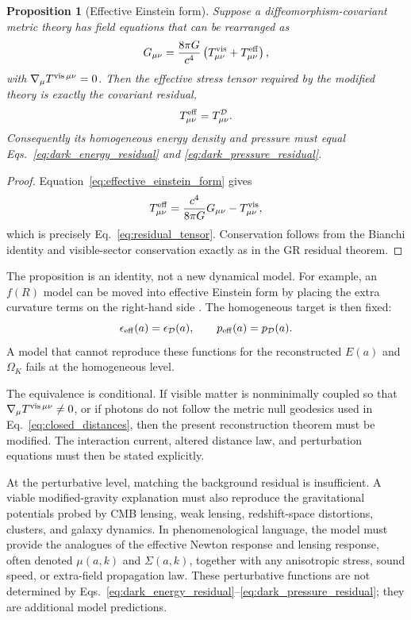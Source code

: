 \documentclass[
  aps,
  prd,
  reprint,
  superscriptaddress,
  nofootinbib,
  floatfix,
  longbibliography
]{revtex4-2}
\theoremstyle{plain}
\newtheorem{proposition}[theorem]{Proposition}
\theoremstyle{definition}
\theoremstyle{remark}
\newcommand{\D}{\mathcal D}
\begin{document}
\begin{proposition}[Effective Einstein form]
Suppose a diffeomorphism-covariant metric theory has field equations that can be
rearranged as
\begin{equation}
G_{\mu\nu}
=\frac{8\pi G}{c^4}\left(T^{\rm vis}_{\mu\nu}
+T^{\rm eff}_{\mu\nu}\right),
\label{eq:effective_einstein_form}
\end{equation}
with $\nabla_\mu T^{{\rm vis}\,\mu\nu}=0$.  Then the effective stress tensor
required by the modified theory is exactly the covariant residual,
\begin{equation}
T^{\rm eff}_{\mu\nu}=T^\D_{\mu\nu}.
\label{eq:Teff_equals_TD}
\end{equation}
Consequently its homogeneous energy density and pressure must equal
Eqs.~\eqref{eq:dark_energy_residual} and \eqref{eq:dark_pressure_residual}.
\end{proposition}

\begin{proof}
Equation~\eqref{eq:effective_einstein_form} gives
\[
T^{\rm eff}_{\mu\nu}
=\frac{c^4}{8\pi G}G_{\mu\nu}-T^{\rm vis}_{\mu\nu},
\]
which is precisely Eq.~\eqref{eq:residual_tensor}.  Conservation follows from
the Bianchi identity and visible-sector conservation exactly as in the GR
residual theorem.
\end{proof}

The proposition is an identity, not a new dynamical model.  For example, an
$f(R)$ model can be moved into effective Einstein form by placing the extra
curvature terms on the right-hand side \cite{HuSawicki2007}.  The homogeneous
target is then fixed:
\[
\epsilon_{\rm eff}(a)=\epsilon_\D(a),\qquad
p_{\rm eff}(a)=p_\D(a).
\]
A model that cannot reproduce these functions for the reconstructed $E(a)$ and
$\Omega_K$ fails at the homogeneous level.

The equivalence is conditional.  If visible matter is nonminimally coupled so
that $\nabla_\mu T^{{\rm vis}\,\mu\nu}\ne0$, or if photons do not follow the
metric null geodesics used in Eq.~\eqref{eq:closed_distances}, then the present
reconstruction theorem must be modified.  The interaction current, altered
distance law, and perturbation equations must then be stated explicitly.

At the perturbative level, matching the background residual is insufficient.  A
viable modified-gravity explanation must also reproduce the gravitational
potentials probed by CMB lensing, weak lensing, redshift-space distortions,
clusters, and galaxy dynamics.  In phenomenological language, the model must
provide the analogues of the effective Newton response and lensing response,
often denoted $\mu(a,k)$ and $\Sigma(a,k)$, together with any anisotropic stress,
sound speed, or extra-field propagation law.  These perturbative functions are
not determined by Eqs.~\eqref{eq:dark_energy_residual}--\eqref{eq:dark_pressure_residual};
they are additional model predictions.
\end{document}
